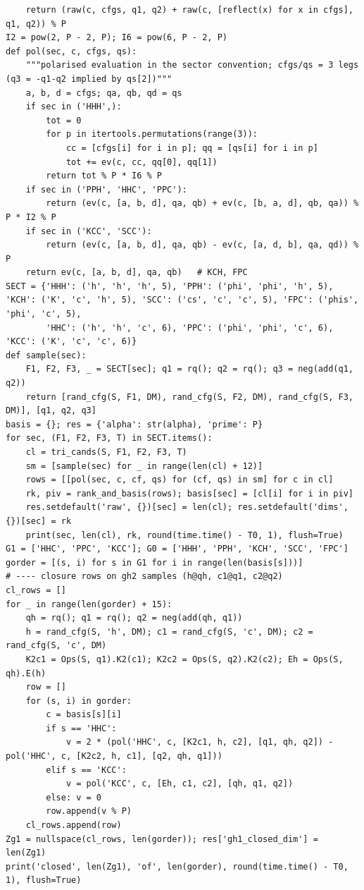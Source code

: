 \documentclass[10pt]{article}
\begin{document}
\begin{lstlisting}
    return (raw(c, cfgs, q1, q2) + raw(c, [reflect(x) for x in cfgs], q1, q2)) % P
I2 = pow(2, P - 2, P); I6 = pow(6, P - 2, P)
def pol(sec, c, cfgs, qs):
    """polarised evaluation in the sector convention; cfgs/qs = 3 legs (q3 = -q1-q2 implied by qs[2])"""
    a, b, d = cfgs; qa, qb, qd = qs
    if sec in ('HHH',):
        tot = 0
        for p in itertools.permutations(range(3)):
            cc = [cfgs[i] for i in p]; qq = [qs[i] for i in p]
            tot += ev(c, cc, qq[0], qq[1])
        return tot % P * I6 % P
    if sec in ('PPH', 'HHC', 'PPC'):
        return (ev(c, [a, b, d], qa, qb) + ev(c, [b, a, d], qb, qa)) % P * I2 % P
    if sec in ('KCC', 'SCC'):
        return (ev(c, [a, b, d], qa, qb) - ev(c, [a, d, b], qa, qd)) % P
    return ev(c, [a, b, d], qa, qb)   # KCH, FPC
SECT = {'HHH': ('h', 'h', 'h', 5), 'PPH': ('phi', 'phi', 'h', 5), 'KCH': ('K', 'c', 'h', 5), 'SCC': ('cs', 'c', 'c', 5), 'FPC': ('phis', 'phi', 'c', 5),
        'HHC': ('h', 'h', 'c', 6), 'PPC': ('phi', 'phi', 'c', 6), 'KCC': ('K', 'c', 'c', 6)}
def sample(sec):
    F1, F2, F3, _ = SECT[sec]; q1 = rq(); q2 = rq(); q3 = neg(add(q1, q2))
    return [rand_cfg(S, F1, DM), rand_cfg(S, F2, DM), rand_cfg(S, F3, DM)], [q1, q2, q3]
basis = {}; res = {'alpha': str(alpha), 'prime': P}
for sec, (F1, F2, F3, T) in SECT.items():
    cl = tri_cands(S, F1, F2, F3, T)
    sm = [sample(sec) for _ in range(len(cl) + 12)]
    rows = [[pol(sec, c, cf, qs) for (cf, qs) in sm] for c in cl]
    rk, piv = rank_and_basis(rows); basis[sec] = [cl[i] for i in piv]
    res.setdefault('raw', {})[sec] = len(cl); res.setdefault('dims', {})[sec] = rk
    print(sec, len(cl), rk, round(time.time() - T0, 1), flush=True)
G1 = ['HHC', 'PPC', 'KCC']; G0 = ['HHH', 'PPH', 'KCH', 'SCC', 'FPC']
gorder = [(s, i) for s in G1 for i in range(len(basis[s]))]
# ---- closure rows on gh2 samples (h@qh, c1@q1, c2@q2)
cl_rows = []
for _ in range(len(gorder) + 15):
    qh = rq(); q1 = rq(); q2 = neg(add(qh, q1))
    h = rand_cfg(S, 'h', DM); c1 = rand_cfg(S, 'c', DM); c2 = rand_cfg(S, 'c', DM)
    K2c1 = Ops(S, q1).K2(c1); K2c2 = Ops(S, q2).K2(c2); Eh = Ops(S, qh).E(h)
    row = []
    for (s, i) in gorder:
        c = basis[s][i]
        if s == 'HHC':
            v = 2 * (pol('HHC', c, [K2c1, h, c2], [q1, qh, q2]) - pol('HHC', c, [K2c2, h, c1], [q2, qh, q1]))
        elif s == 'KCC':
            v = pol('KCC', c, [Eh, c1, c2], [qh, q1, q2])
        else: v = 0
        row.append(v % P)
    cl_rows.append(row)
Zg1 = nullspace(cl_rows, len(gorder)); res['gh1_closed_dim'] = len(Zg1)
print('closed', len(Zg1), 'of', len(gorder), round(time.time() - T0, 1), flush=True)

\end{lstlisting}
\end{document}
